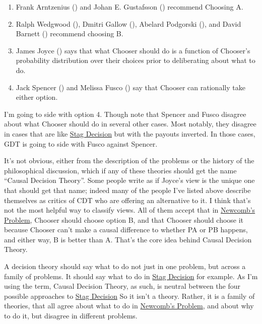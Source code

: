 \documentclass[
  12pt,
  letterpaper,
  DIV=11,
  numbers=noendperiod]{scrreprt}
\providecommand{\tightlist}{%
  \setlength{\itemsep}{0pt}\setlength{\parskip}{0pt}}\usepackage{longtable,booktabs,array}
\begin{document}
\begin{enumerate}
\def\labelenumi{\arabic{enumi}.}
\tightlist
\item
  Frank Arntzenius () and Johan E.
  Gustafsson () recommend Choosing A.
\item
  Ralph Wedgwood (), Dmitri Gallow
  (), Abelard Podgorski
  (), and David Barnett
  () recommend choosing B.
\item
  James Joyce () says that what Chooser
  should do is a function of Chooser's probability distribution over
  their choices prior to deliberating about what to do.
\item
  Jack Spencer () and Melissa Fusco
  () say that Chooser can rationally take
  either option.
\end{enumerate}

I'm going to side with option 4. Though note that Spencer and Fusco
disagree about what Chooser should do in several other cases. Most
notably, they disagree in cases that are like
\hyperref[tbl-stag-decision-first]{Stag Decision} but with the payouts
inverted. In those cases, GDT is going to side with Fusco against
Spencer.

It's not obvious, either from the description of the problems or the
history of the philosophical discussion, which if any of these theories
should get the name ``Causal Decision Theory''. Some people write as if
Joyce's view is the unique one that should get that name; indeed many of
the people I've listed above describe themselves as critics of CDT who
are offering an alternative to it. I think that's not the most helpful
way to classify views. All of them accept that in
\hyperref[tbl-newcomb]{Newcomb's Problem}, Chooser should choose option
B, and that Chooser should choose it because Chooser can't make a causal
difference to whether PA or PB happens, and either way, B is better than
A. That's the core idea behind Causal Decision Theory.

A decision theory should say what to do not just in one problem, but
across a family of problems. It should say what to do in
\hyperref[tbl-stag-decision-first]{Stag Decision} for example. As I'm
using the term, Causal Decision Theory, as such, is neutral between the
four possible approaches to \hyperref[tbl-stag-decision-first]{Stag
Decision} So it isn't a theory. Rather, it is a family of theories, that
all agree about what to do in \hyperref[tbl-newcomb]{Newcomb's Problem},
and about why to do it, but disagree in different problems.
\end{document}

